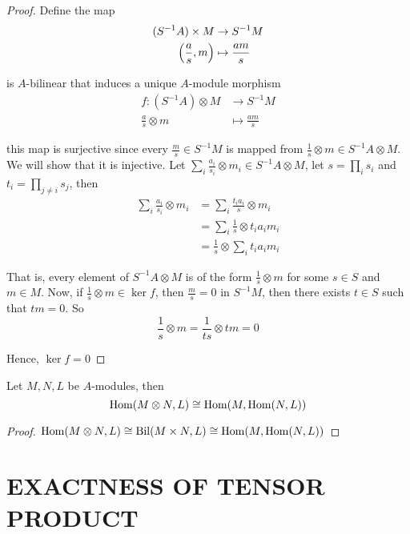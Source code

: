 \begin{proof}
	Define the map
	\begin{align*}
		(S^{-1} A) \times M &\to S^{-1} M \\
		\tuple*{\frac{a}{s}, m} &\mapsto \frac{am}{s}
	\end{align*}
	
	is $A$-bilinear that induces a unique $A$-module morphism
	\begin{align*}
		f: (S^{-1} A) \otimes M &\to S^{-1} M \\
		\frac{a}{s} \otimes m &\mapsto \frac{am}{s}
	\end{align*}
	
	this map is surjective since every $\frac{m}{s} \in S^{-1} M$ is mapped from $\frac{1}{s} \otimes m \in S^{-1} A \otimes M$. We will show that it is injective. Let $\sum_{i} \frac{a_i}{s_i} \otimes m_i \in S^{-1}A \otimes M$, let $s = \prod_{i} s_i$ and $t_i = \prod_{j \neq i} s_j$, then
	\begin{align*}
		\sum_{i} \frac{a_i}{s_i} \otimes m_i
		&= \sum_{i} \frac{t_i a_i}{s} \otimes m_i \\
		&= \sum_{i} \frac{1}{s} \otimes t_i a_i m_i \\
		&= \frac{1}{s} \otimes \sum_{i} t_i a_i m_i
	\end{align*}
	
	That is, every element of $S^{-1} A \otimes M$ is of the form $\frac{1}{s} \otimes m$ for some $s \in S$ and $m \in M$. Now, if $\frac{1}{s} \otimes m \in \ker f$, then $\frac{m}{s} = 0$ in $S^{-1} M$, then there exists $t \in S$ such that $tm = 0$. So
	$$
		\frac{1}{s} \otimes m = \frac{1}{ts} \otimes tm = 0
	$$
	
	Hence, $\ker f = 0$
\end{proof}

\begin{proposition}
	Let $M, N, L$ be $A$-modules, then
	$$
		\Hom(M \otimes N, L) \cong \Hom(M, \Hom(N, L))
	$$
\end{proposition}

\begin{proof}
	$
		\Hom(M \otimes N, L) \cong  \Bil(M \times N, L) \cong \Hom(M, \Hom(N, L))
	$
\end{proof}

\section{EXACTNESS OF TENSOR PRODUCT}

